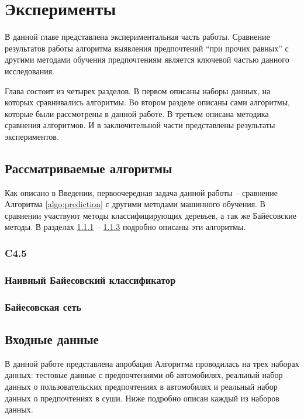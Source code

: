 \chapter{Эксперименты}
\label{chapter:experiments}
В данной главе представлена экспериментальная часть работы. Сравнение результатов работы алгоритма выявления предпочтений \enquote{при прочих равных} с другими методами обучения предпочтениям является ключевой частью данного исследования.

Глава состоит из четырех разделов. В первом описаны наборы данных, на которых сравнивались алгоритмы. Во втором разделе описаны сами алгоритмы, которые были рассмотрены в данной работе. В третьем описана методика сравнения алгоритмов. И в заключительной части представлены результаты экспериментов.

\section{Рассматриваемые алгоритмы}

Как описано в Введении, первоочередная задача данной работы – сравнение Алгоритма \ref{algo:prediction} с другими методами машинного обучения. В сравнении участвуют методы классифицирующих деревьев, а так же Байесовские методы. В разделах \ref{subsec:c4.5} -- \ref{subsec:bayes_net} подробно описаны эти алгоритмы.

	\subsection{C4.5}
	\label{subsec:c4.5}
	
	\subsection{Наивный Байесовский классификатор}
	\label{subsec:naive_bayes}
	
	\subsection{Байесовская сеть}
	\label{subsec:bayes_net}

\section{Входные данные}
	В данной работе представлена
	апробация Алгоритма проводилась на трех наборах данных: тестовые данные с предпочтениями об автомобилях, реальный набор данных о пользовательских предпочтениях в автомобилях %
	и реальный набор данных о предпочтениях в суши. Ниже подробно описан каждый из наборов данных.
	
